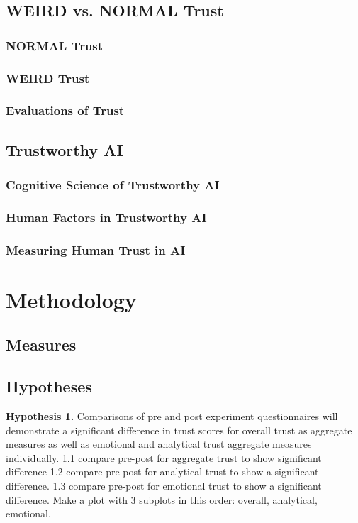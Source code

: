 \documentclass[a4paper,fleqn]{cas-sc}
\begin{document}
\subsection{WEIRD vs. NORMAL Trust}
\subsubsection{NORMAL Trust}
\subsubsection{WEIRD Trust}
\subsubsection{Evaluations of Trust}


\subsection{Trustworthy AI}
\subsubsection{Cognitive Science of Trustworthy AI}
\subsubsection{Human Factors in Trustworthy AI}
\subsubsection{Measuring Human Trust in AI}
\fi 

\section{Methodology}
\subsection{Measures}
\subsection{Hypotheses}
\textbf{Hypothesis 1.} Comparisons of pre and post experiment questionnaires will demonstrate a significant difference in trust scores for overall trust as aggregate measures as well as emotional and analytical trust aggregate measures individually.
1.1 compare pre-post for aggregate trust to show significant difference
1.2 compare pre-post for analytical trust to show a significant difference.
1.3 compare pre-post for emotional trust to show a significant difference.
Make a plot with 3 subplots in this order: overall, analytical, emotional.
\end{document}
